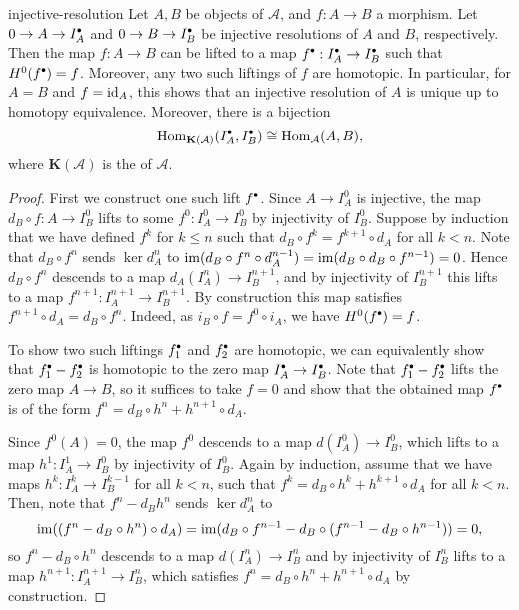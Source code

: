 \begin{example}{injective-resolution}
    Let $A, B$ be objects of $\mathcal{A}$, and $f : A \to B$ a morphism. Let $0 \to A \to I_A^\bdot$ and $0 \to B \to I_B^\bdot$ be injective resolutions of $A$ and $B$, respectively. Then the map $f : A \to B$ can be lifted to a map $f^\bdot : I_A^\bdot \to I_B^\bdot$ such that $H^0(f^\bdot) = f$. Moreover, any two such liftings of $f$ are homotopic. In particular, for $A = B$ and $f = \textup{id}_A$, this shows that an injective resolution of $A$ is unique up to homotopy equivalence. Moreover, there is a bijection
    \[ \Hom_{\textbf{K}(\mathcal{A})}(I_A^\bdot, I_B^\bdot) \isom \Hom_{\mathcal{A}}(A, B) , \]
    where $\textbf{K}(\mathcal{A})$ is the  of $\mathcal{A}$.
    \begin{proof}
        First we construct one such lift $f^\bdot$. Since $A \to I_A^0$ is injective, the map $d_B \circ f : A \to I_B^0$ lifts to some $f^0 : I_A^0 \to I_B^0$ by injectivity of $I_B^0$. Suppose by induction that we have defined $f^k$ for $k \le n$ such that $d_B \circ f^k = f^{k + 1} \circ d_A$ for all $k < n$. Note that $d_B \circ f^n$ sends $\ker d_A^n$ to $\operatorname{im} (d_B \circ f^n \circ d_A^{n - 1}) = \operatorname{im} (d_B \circ d_B \circ f^{n - 1}) = 0$. Hence $d_B \circ f^n$ descends to a map $d_A(I_A^n) \to I_B^{n + 1}$, and by injectivity of $I_B^{n + 1}$ this lifts to a map $f^{n + 1} : I_A^{n + 1} \to I_B^{n + 1}$. By construction this map satisfies $f^{n + 1} \circ d_A = d_B \circ f^n$. Indeed, as $i_B \circ f = f^0 \circ i_A$, we have $H^0(f^\bdot) = f$.
    
        To show two such liftings $f_1^\bdot$ and $f_2^\bdot$ are homotopic, we can equivalently show that $f_1^\bdot - f_2^\bdot$ is homotopic to the zero map $I_A^\bdot \to I_B^\bdot$. Note that $f_1^\bdot - f_2^\bdot$ lifts the zero map $A \to B$, so it suffices to take $f = 0$ and show that the obtained map $f^\bdot$ is of the form $f^n = d_B \circ h^n + h^{n + 1} \circ d_A$.
    
        Since $f^0(A) = 0$, the map $f^0$ descends to a map $d(I_A^0) \to I_B^0$, which lifts to a map $h^1 : I_A^1 \to I_B^0$ by injectivity of $I_B^0$. Again by induction, assume that we have maps $h^k : I_A^k \to I_B^{k - 1}$ for all $k < n$, such that $f^k = d_B \circ h^k + h^{k + 1} \circ d_A$ for all $k < n$. Then, note that $f^n - d_B h^n$ sends $\ker d_A^n$ to
        \[ \operatorname{im} ((f^n - d_B \circ h^n) \circ d_A) = \operatorname{im} (d_B \circ f^{n - 1} - d_B \circ (f^{n - 1} - d_B \circ h^{n - 1})) = 0 , \]
        so $f^n - d_B \circ h^n$ descends to a map $d(I_A^n) \to I_B^n$ and by injectivity of $I_B^n$ lifts to a map $h^{n + 1} : I_A^{n + 1} \to I_B^n$, which satisfies $f^n = d_B \circ h^n + h^{n + 1} \circ d_A$ by construction.
    \end{proof}
\end{example}


